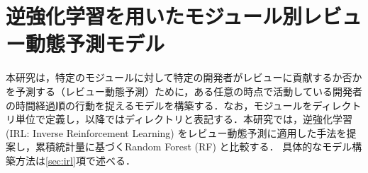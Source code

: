 \documentclass[submit]{ipsj}
\newcommand{\todo}[1]{\colorbox{yellow}{{\bf TODO}:}{\color{red} {\textbf{[#1]}}}}
\begin{document}




\section{逆強化学習を用いたモジュール別レビュー動態予測モデル}\label{sec:model}

本研究は，特定のモジュールに対して特定の開発者がレビューに貢献するか否かを予測する（レビュー動態予測）ために，ある任意の時点で活動している開発者の時間経過順の行動を捉えるモデルを構築する．なお，モジュールをディレクトリ単位で定義し，以降ではディレクトリと表記する．本研究では，逆強化学習 (IRL: Inverse Reinforcement Learning) をレビュー動態予測に適用した手法を提案し，累積統計量に基づくRandom Forest (RF) と比較する．
具体的なモデル構築方法は\ref{sec:irl}項で述べる．
\end{document}
